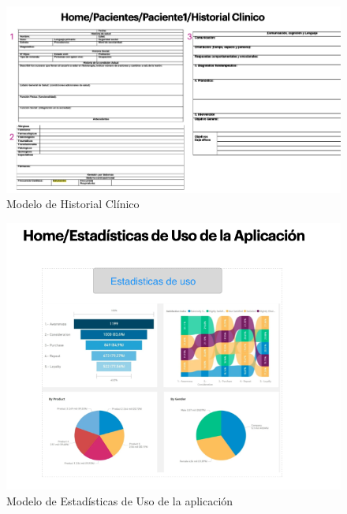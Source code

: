 \documentclass[12pt]{article}
\begin{document}
\begin{figure}[ht]
\centering
\includegraphics[scale=0.36]{imag/P11.png}
\caption{Modelo de Historial Clínico }
\label{6}
\end{figure}
\FloatBarrier


\begin{figure}[ht]
\centering
\includegraphics[scale=0.36]{imag/P12.png}
\caption{Modelo de Estadísticas de Uso de la aplicación }
\label{6}
\end{figure}
\FloatBarrier
\end{document}
